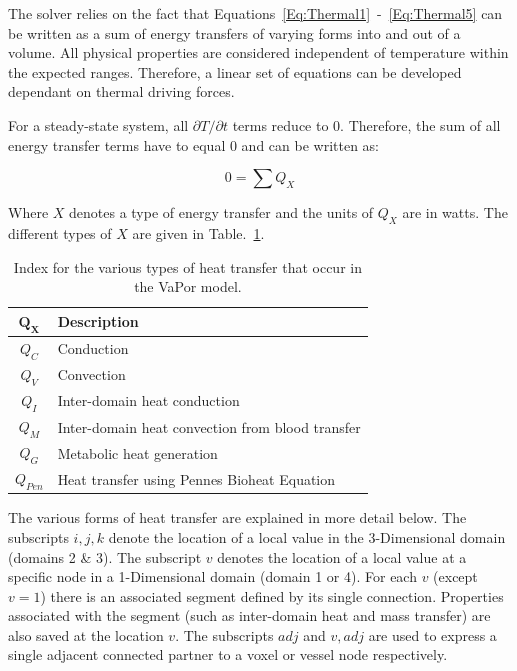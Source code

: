 \documentclass[11pt,english,a4paper,twoside,openright]{report}
\begin{document}
{{{{{{{{The solver relies on the fact that Equations~\ref{Eq:Thermal1}~-~\ref{Eq:Thermal5} can be written as a sum of energy transfers of varying forms into and out of a volume. All physical properties are considered independent of temperature within the expected ranges. Therefore, a linear set of equations can be developed dependant on thermal driving forces.

For a steady-state system, all $\partial T / \partial t$ terms reduce to 0. Therefore, the sum of all energy transfer terms have to equal 0 and can be written as:

\begin{equation}
\label{Eq:TempSum}
0 = \sum Q_{X}
\end{equation}

Where $X$ denotes a type of energy transfer and the units of $Q_{X}$ are in watts. The different types of $X$ are given in Table.~\ref{tab:EnergyTransfer}.

\begin{table}[h]
	\centering
	\fontsize{8pt}{9pt}\selectfont
	\begin{tabular}{c p{6.5cm}}
		\toprule
		$\mathbf{Q_{X}}$ & \textbf{Description}\\ \hline
		$Q_{C}$ & Conduction \\  
		$Q_{V}$ & Convection \\ 
		$Q_{I}$ & Inter-domain heat conduction \\ 
		$Q_{M}$ & Inter-domain heat convection from blood transfer\\ 
		$Q_{G}$ & Metabolic heat generation \\ 
		$Q_{Pen}$ & Heat transfer using Pennes Bioheat Equation \\ \bottomrule
	\end{tabular}
	\caption[Index for the various types of heat transfer that occur in the VaPor model]{Index for the various types of heat transfer that occur in the VaPor model.}
	\label{tab:EnergyTransfer}
\end{table}

The various forms of heat transfer are explained in more detail below. The subscripts $i,j,k$ denote the location of a local value in the 3-Dimensional domain (domains 2 \& 3). The subscript $v$ denotes the location of a local value at a specific node in a 1-Dimensional domain (domain 1 or 4). For each $v$ (except $v=1$) there is an associated segment defined by its single connection. Properties associated with the segment (such as inter-domain heat and mass transfer) are also saved at the location $v$. The subscripts $adj$ and $v,adj$ are used to express a single adjacent connected partner to a voxel or vessel node respectively.

}}}}}}}}
\end{document}

